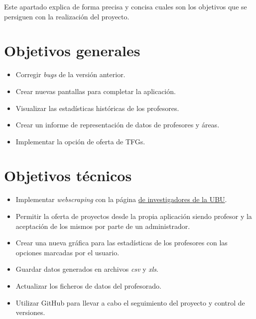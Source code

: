 
Este apartado explica de forma precisa y concisa cuales son los objetivos que se persiguen con la realización del proyecto.

\section{Objetivos generales}
\begin{itemize}
	\item Corregir \emph{bugs} de la versión anterior.
	\item Crear nuevas pantallas para completar la aplicación.
	\item Visualizar las estadísticas históricas de los profesores.
	\item Crear un informe de representación de datos de profesores y áreas.
	\item Implementar la opción de oferta de TFGs.
\end{itemize}
\section{Objetivos técnicos}
\begin{itemize}
	\item Implementar \emph{webscraping} con la página \href{https://investigacion.ubu.es/unidades/2682/investigadores}{de investigadores de la UBU}.
	\item Permitir la oferta de proyectos desde la propia aplicación siendo profesor y la aceptación de los mismos por parte de un administrador.
	\item Crear una nueva gráfica para las estadísticas de los profesores con las opciones marcadas por el usuario.
	\item Guardar datos generados en archivos \emph{csv} y \emph{xls}.
	\item Actualizar los ficheros de datos del profesorado.
	\item Utilizar GitHub para llevar a cabo el seguimiento del proyecto y control de versiones.
\end{itemize}